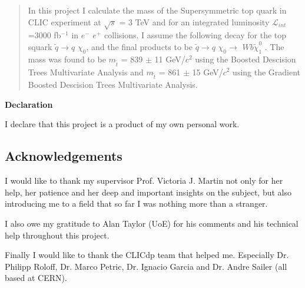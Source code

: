 \documentclass[12pt,a4paper]{report}
\begin{document}
\newpage



\begin{abstract}
In this project I calculate the mass of the Supersymmetric top quark in CLIC experiment at $\sqrt{s}$ = 3 TeV
and for an integrated luminosity $\mathcal{L}_{int}$=3000 fb$^{-1}$
in $e^{-}$ $e^{+}$ collisions. I assume the following decay for the top squark $\tilde{q} \rightarrow q$ 
$\chi_{0}$, 
and the final products to be
$\tilde{q} \rightarrow q$ $\chi_{0} \rightarrow$ $W b \tilde{\chi}_{1}^{0}$ .
The mass was found  to be  $m_{\tilde{t}}$ = 839 $\pm$ 11 GeV/$c^{2}$ using the Boosted Descision 
Trees Multivariate Analysis and $m_{\tilde{t}}$ = 861 $\pm$ 15 GeV/$c^{2}$ using the Gradient Boosted Descision  Trees Multivariate Analysis. 
\end{abstract}



\textbf{Declaration}

I declare that this project is a product of my own personal work.


\newpage

\tableofcontents
\listoftables
\listoffigures

\begin{titlepage}
\vspace*{2in}
\section*{Acknowledgements}

I would like to thank my supervisor Prof. Victoria J. Martin not only for her help, her patience and
her deep and important insights on the subject, but also introducing me to a field that so far I was nothing 
more than a stranger.

I also owe my gratitude to Alan Taylor (UoE) for his comments and his technical help throughout this 
project.

Finally I would like to thank the CLICdp team that helped me. Especially
Dr. Philipp Roloff, Dr. Marco Petric, Dr. Ignacio Garcia and Dr. Andre Sailer (all based at CERN).


\end{titlepage}

\end{document}
